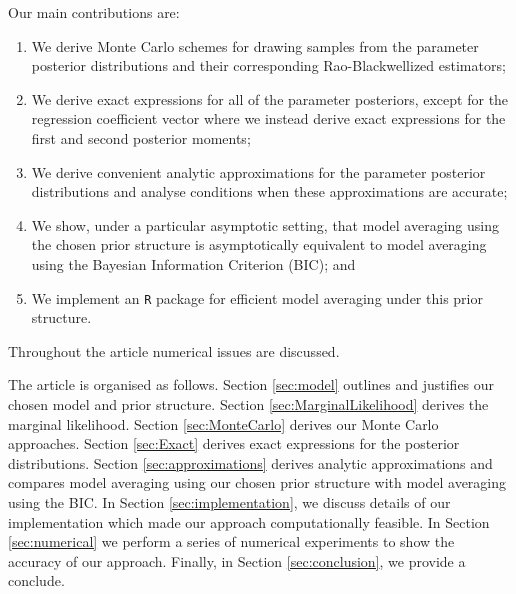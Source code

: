 \documentclass{article}[12pt]
\begin{document}
 
Our main contributions are:
\begin{enumerate}
	\item We derive Monte Carlo schemes for drawing samples from the parameter posterior distributions and their corresponding Rao-Blackwellized estimators;
	
	\item We derive exact expressions for all of the parameter posteriors, except for the regression coefficient vector where we instead derive exact expressions for the first and
	second posterior moments;
	
	\item We derive convenient analytic approximations for the parameter posterior distributions and analyse conditions when these approximations are accurate;
	
	\item We show, under a particular asymptotic setting, that model averaging using the chosen prior structure is asymptotically equivalent to model averaging using the Bayesian Information Criterion (BIC); and
	
	\item We implement an {\tt R} package for efficient model averaging under this prior structure.
\end{enumerate}

\noindent Throughout the article numerical issues are discussed.

The article is organised as follows. Section \ref{sec:model} outlines and justifies our chosen model 
and prior structure. Section \ref{sec:MarginalLikelihood} derives the marginal likelihood. Section 
\ref{sec:MonteCarlo} derives our Monte Carlo approaches. Section \ref{sec:Exact} derives exact expressions
for the posterior distributions. Section \ref{sec:approximations} derives analytic approximations
and compares model averaging using our chosen prior structure with model averaging using the BIC.
In Section \ref{sec:implementation}, we discuss details of our implementation which made our approach 
computationally feasible.
In Section \ref{sec:numerical} we perform a series of numerical experiments to show the accuracy of our approach. 
Finally, in Section \ref{sec:conclusion}, we provide a conclude.









 



 
\end{document}

